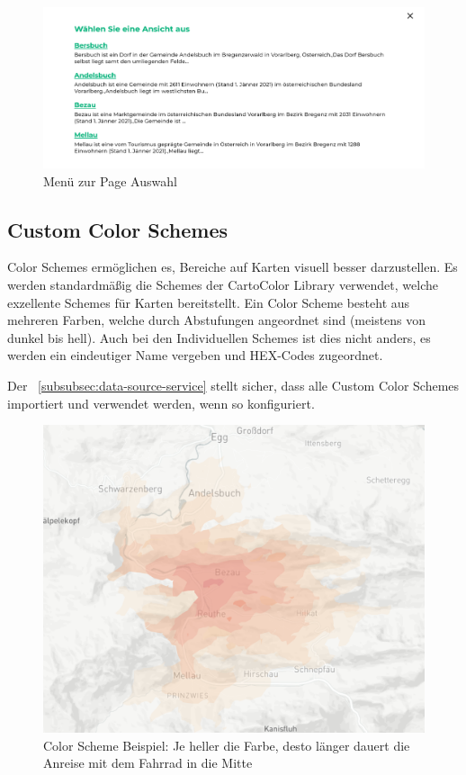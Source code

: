 \begin{figure}[hbt!]
    \centering
    \includegraphics[scale=.9]{pics/menu}
    \caption{Menü zur Page Auswahl}
    \label{fig:menu}
\end{figure}

\subsection{Custom Color Schemes}
Color Schemes ermöglichen es, Bereiche auf Karten visuell besser darzustellen.
Es werden standardmäßig die Schemes der CartoColor Library verwendet, welche exzellente Schemes für Karten bereitstellt.
Ein Color Scheme besteht aus mehreren Farben, welche durch Abstufungen angeordnet sind (meistens von dunkel bis hell).
Auch bei den Individuellen Schemes ist dies nicht anders, es werden ein eindeutiger Name vergeben und HEX-Codes zugeordnet.

Der ~\ref{subsubsec:data-source-service} stellt sicher, dass alle Custom Color Schemes importiert und verwendet werden, wenn so konfiguriert.

\begin{figure}[hbt!]
    \centering
    \includegraphics[scale=.6]{pics/color-scheme-example}
    \caption{Color Scheme Beispiel: Je heller die Farbe, desto länger dauert die Anreise mit dem Fahrrad in die Mitte}
    \label{fig:color-scheme-example}
\end{figure}

